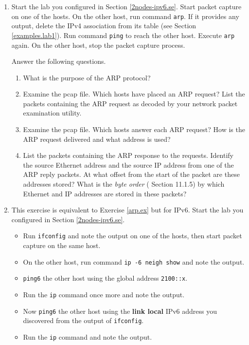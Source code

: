 \documentclass[12pt]{book}
\begin{document}
\begin{enumerate}
\item\label{arp.ex} Start the lab you configured in Section
  \ref*{2nodes-ipv6.se}. Start packet capture on one of the hosts. On
  the other host, run command \verb$arp$. If it provides any output,
  delete the IPv4 association from its table (see Section
  \ref*{examples.lab1}). Run command \verb$ping$ to reach the other
  host. Execute \verb$arp$ again. On the other host, stop the packet
  capture process. 

  Answer the following questions. 
  \begin{enumerate}[label=(\alph*)]
    \item What is the purpose of the ARP protocol?

    \item Examine the pcap file. Which hosts have placed an ARP
      request? List the packets containing the ARP request as decoded
      by your network packet examination utility.

    \item Examine the pcap file. Which hosts answer each ARP request?
      How is the ARP request delivered and what
      address is used?

    \item List the packets containing the ARP response to the
      requests. Identify the source Ethernet address and the source IP
      address from one of the ARP reply packets. At what offset from
      the start of the packet are these addresses stored? What is the
      \emph{byte order} (\cite{dordal2019introduction} Section 11.1.5)
      by which Ethernet and IP addresses are stored in
      these packets?
  \end{enumerate}

\item This exercise is equivalent to Exercise \ref*{arp.ex} but for
  IPv6. Start the lab you configured in Section
  \ref*{2nodes-ipv6.se}. 
\begin{itemize}[label=-]
  \item Run \verb$ifconfig$ and note the output on
  one of the hosts, then start packet capture on the same host. 
\item On the other host, run command \verb$ip -6 neigh show$
  \cite{arpipv6} and note
  the output. 
\item \verb$ping6$ the other host using the global address
  \verb$2100::x$.
\item Run the \verb$ip$ command once more and note the output.
\item Now \verb$ping6$ the other host using the \textbf{link local}
  IPv6 address you discovered from the output of \verb$ifconfig$.
\item Run the \verb$ip$ command and note the output.
\end{itemize}


\end{enumerate}
\end{document}
